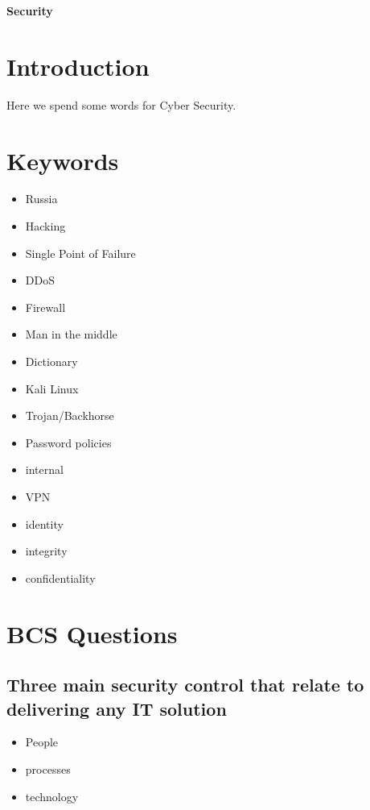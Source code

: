\documentclass[a4paper,12pt]{article}
\begin{document}
\textbf{Security}


\tableofcontents
\clearpage

 
\section{Introduction}
Here we spend some words for Cyber Security.
\section{Keywords}

\begin{itemize}
\item Russia
\item Hacking
\item Single Point of Failure
\item DDoS
\item Firewall
\item Man in the middle
\item Dictionary
\item Kali Linux
\item Trojan/Backhorse
\item Password policies
\item internal
\item VPN
\item identity 
\item integrity
\item confidentiality
\end{itemize}

\section{BCS Questions}

\subsection {Three main security control that relate to delivering any IT solution}
\begin{itemize}
\item People
\item processes
\item technology 
\end{itemize}
\end{document}
